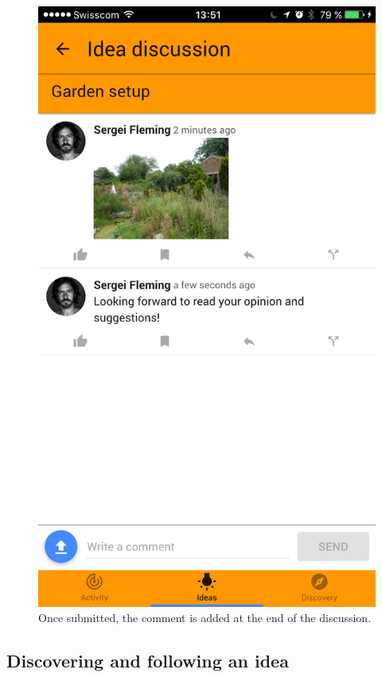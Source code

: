 \documentclass[a4paper,12pt,twoside]{article}
\begin{document}
\begin{figure}[!htb]
\begin{minipage}[t]{.32\textwidth}
        \includegraphics[width=\textwidth]{images/flow_addComment_3.png}
        \caption{Once submitted, the comment is added at the end of the discussion.}
    \end{minipage}
\end{figure}

\clearpage
\subsection{Discovering and following an idea}
\label{sec.followingIdea}
\end{document}

